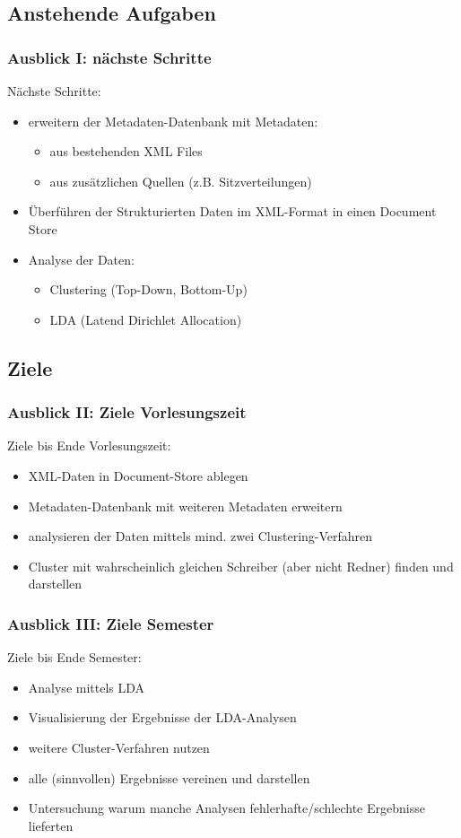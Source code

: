 \documentclass[11pt, a4paper]{beamer}
\begin{document}
\subsection{Anstehende Aufgaben}
\begin{frame}
\frametitle{Ausblick I: nächste Schritte}
Nächste Schritte:
\begin{itemize}
	\item  erweitern der Metadaten-Datenbank mit Metadaten:
		\begin{itemize}
			\item aus bestehenden XML Files
			\item aus zusätzlichen Quellen (z.B. Sitzverteilungen)
	 	\end{itemize}
	\item  Überführen der Strukturierten Daten im XML-Format in einen Document Store
	\item  Analyse der Daten: 
		\begin{itemize}
			\item Clustering (Top-Down, Bottom-Up)
			\item LDA (Latend Dirichlet Allocation)
	 	\end{itemize}
	\end{itemize}
\end{frame}

\subsection{Ziele}
\begin{frame}
\frametitle{Ausblick II: Ziele Vorlesungszeit}

Ziele bis Ende Vorlesungszeit:
\begin{itemize}
	\item XML-Daten in Document-Store ablegen
	\item Metadaten-Datenbank mit weiteren Metadaten erweitern
	\item analysieren der Daten mittels mind. zwei Clustering-Verfahren 
	\item Cluster mit wahrscheinlich gleichen Schreiber (aber nicht Redner) finden und darstellen
\end{itemize}
\end{frame}

\begin{frame}
\frametitle{Ausblick III: Ziele Semester}

Ziele bis Ende Semester:
\begin{itemize}
	\item Analyse mittels LDA
	\item Visualisierung der Ergebnisse der LDA-Analysen
	\item weitere Cluster-Verfahren nutzen
	\item alle (sinnvollen) Ergebnisse vereinen und darstellen
	\item Untersuchung warum manche Analysen fehlerhafte/schlechte Ergebnisse lieferten
\end{itemize}
\end{frame}
\end{document}
